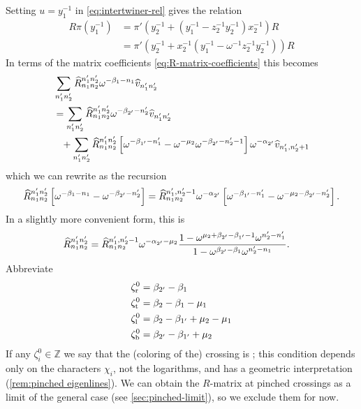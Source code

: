 \documentclass{sl2ams}
\numberwithin{equation}{section}
\newcommand{\ZZ}{\mathbb{Z}}
\begin{document}
Setting $u = y_1^{-1}$ in \eqref{eq:intertwiner-rel} gives the relation
\begin{equation}
  \label{eq:yinv-rel}
  \begin{aligned}
    R \pi(y_1^{-1}) &= \pi'\left( y_2^{-1} + (y_1^{-1} - z_2^{-1} y_2^{-1})x_2^{-1}\right) R \\
                    &= \pi'\left( y_2^{-1} + x_2^{-1}(y_1^{-1} - \omega^{-1} z_2^{-1} y_2^{-1})\right) R
  \end{aligned}
\end{equation}
In terms of the matrix coefficients \eqref{eq:R-matrix-coefficients} this becomes
\begin{align*}
  &  \sum_{n_1' n_2'} \rmat{n_1}{n_2}{n_1'}{n_2'}  \omega^{-\beta_1 - n_1}  \vbh{n_1' n_2'} \\
  &= \sum_{n_1' n_2'} \rmat{n_1}{ n_2}{n_1'}{ n_2'} \omega^{-\beta_{2'} - n_2'} \vbh{n_1' n_2'} \\
  &\phantom{=} + \sum_{n_1' n_2'} \rmat{n_1}{ n_2}{n_1'}{ n_2'}\left[ \omega^{-\beta_{1'} - n_1'}  - \omega^{-\mu_2} \omega^{-\beta_{2'} - n_2' - 1} \right] \omega^{-\alpha_{2'}} \vbh{n_1', n_2'+1}
\end{align*}
which we can rewrite as the recursion
\[
  \rmat{n_1}{n_2}{n_1'}{n_2'} \left[ \omega^{-\beta_1 - n_1}  - \omega^{-\beta_{2'} - n_2'} \right]
  =
  \rmat{n_1}{n_2}{n_1',}{n_2'-1} \omega^{-\alpha_{2'}} \left[ \omega^{-\beta_{1'} - n_1'} - \omega^{- \mu_2 - \beta_{2'} - n_2'} \right]
  .
\]
In a slightly more convenient form, this is
\begin{align*}
  \rmat{n_1}{n_2}{n_1'}{n_2' }
  &=
  \rmat{n_1}{n_2}{n_1',}{n_2' -1}
  \omega^{-\alpha_{2'} - \mu_2}
  \frac
  {1 - \omega^{\mu_2 + \beta_{2'} - \beta_{1'} - 1} \omega^{n_2' - n_1'}}
  {1 - \omega^{\beta_{2'} - \beta_{1}} \omega^{n_2' - n_1}} 
  .
\end{align*}
Abbreviate
\begin{align*}
  \zeta_{\mathrm{r}}^0
  &=
  \beta_{2'} - \beta_1
  \\
  \zeta_{\mathrm{t}}^0
  &=
  \beta_{2} - \beta_{1} - \mu_1 
  \\
  \zeta_{\mathrm{l}}^0
  &=
  \beta_{2} - \beta_{1'} + \mu_2 - \mu_1 
  \\
  \zeta_{\mathrm{b}}^0
  &=
  \beta_{2'} - \beta_{1'} + \mu_2 
\end{align*}
If any \(\zeta_i^0 \in \ZZ\) we say that the (coloring of the) crossing is ; this condition depends only on the characters \(\chi_i\), not the logarithms, and has a geometric interpretation (\cref{rem:pinched eigenlines}).
We can obtain the \(R\)-matrix at pinched crossings as a limit of the general case (see \cref{sec:pinched-limit}), so we exclude them for now.
\end{document}
